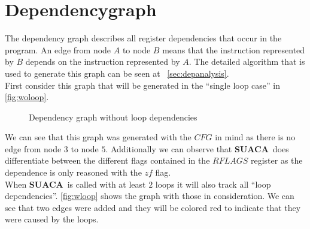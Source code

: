 \documentclass[a4paper,12pt,titlepage, twoside]{report}
\newcommand{\suaca}{\textbf{SUACA}}
\begin{document}
\section{Dependencygraph}
The dependency graph describes all register dependencies that occur in the program. An edge from node $A$ to node $B$ means that the instruction represented by $B$ depends on the instruction represented by $A$. The detailed algorithm that is used to generate this graph can be seen at ~\autoref{sec:depanalysis}.\\
First consider this graph that will be generated in the ``single loop case'' in \autoref{fig:woloop}.\\


\begin{figure}
\centering
{}
\caption{Dependency graph without loop dependencies}
\label{fig:woloop}
\end{figure}


We can see that this graph was generated with the $CFG$ in mind as there is no edge from node $3$ to node $5$. Additionally we can observe that \suaca\ does differentiate between the different flags contained in the $RFLAGS$ register as the dependence is only reasoned with the $zf$ flag.\\
When \suaca\ is called with at least $2$ loops it will also track all ``loop dependencies''. \autoref{fig:wloop} shows the graph with those in consideration. We can see that two edges were added and they will be colored red to indicate that they were caused by the loops.
\end{document}
